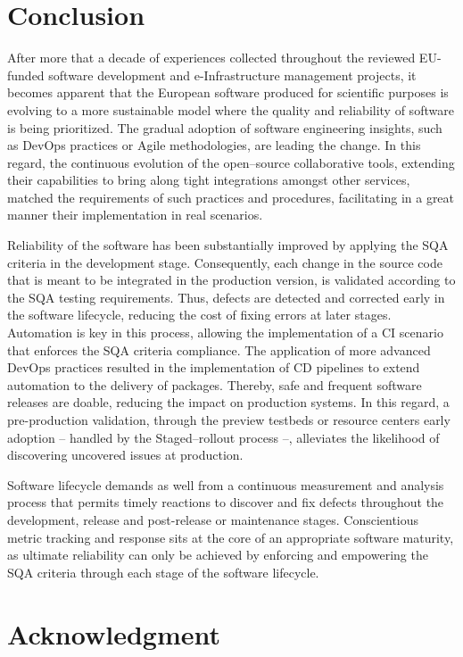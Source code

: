 \documentclass[journal]{IEEEtran}
\begin{document}
\section{Conclusion}
\label{sec:con}

After more that a decade of experiences collected throughout the reviewed
EU-funded software development and e-Infrastructure management projects, it
becomes apparent that the European software produced for scientific purposes is
evolving to a more sustainable model where the quality and reliability of
software is being prioritized. The gradual adoption of software engineering insights, such as
DevOps practices or Agile methodologies, are leading the change. In this regard, the continuous evolution of the open--source
collaborative tools, extending their capabilities to bring along tight
integrations amongst other services, matched the requirements of such practices
and procedures, facilitating in a great manner their implementation in real scenarios.

Reliability of the software has been substantially improved by applying the SQA
criteria in the development stage. Consequently, each change in the source code
that is meant to be integrated in the production version, is validated according
to the SQA testing requirements. Thus, defects are detected and corrected early in the
software lifecycle, reducing the cost of fixing errors at later stages. Automation is
key in this process, allowing the implementation of a CI scenario that enforces
the SQA criteria compliance. The application of more advanced DevOps practices
resulted in the implementation of CD pipelines to extend automation to the
delivery of packages. Thereby, safe and frequent software releases are doable, reducing
the impact on production systems. In this regard, a pre-production validation,
through the preview testbeds or resource centers early adoption -- handled by the
Staged--rollout process --, alleviates the likelihood of discovering uncovered
issues at production.

Software lifecycle demands as well from a continuous measurement and analysis
process that permits timely reactions to discover and fix defects throughout the
development, release and post-release or maintenance stages. Conscientious metric
tracking and response sits at the core of an appropriate software maturity, as
ultimate reliability can only be achieved by enforcing and empowering the SQA
criteria through each stage of the software lifecycle.

\section*{Acknowledgment}
\end{document}
